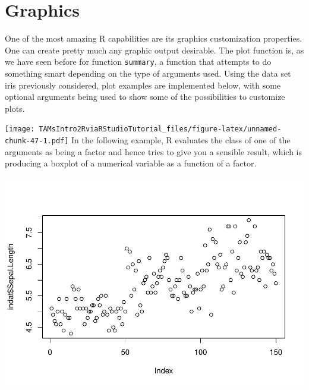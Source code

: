 \documentclass[
]{article}
\newenvironment{Shaded}{\begin{snugshade}}{\end{snugshade}}
\newcommand{\CommentTok}[1]{\textcolor[rgb]{0.56,0.35,0.01}{\textit{#1}}}
\newcommand{\FunctionTok}[1]{\textcolor[rgb]{0.00,0.00,0.00}{#1}}
\newcommand{\NormalTok}[1]{#1}
\newcommand{\OtherTok}[1]{\textcolor[rgb]{0.56,0.35,0.01}{#1}}
\newcommand{\SpecialCharTok}[1]{\textcolor[rgb]{0.00,0.00,0.00}{#1}}
\begin{document}
\hypertarget{graphics}{%
\section{Graphics}\label{graphics}}

One of the most amazing R capabilities are its graphics customization
properties. One can create pretty much any graphic output desirable. The
plot function is, as we have seen before for function \texttt{summary},
a function that attempts to do something smart depending on the type of
arguments used. Using the data set iris previously considered, plot
examples are implemented below, with some optional arguments being used
to show some of the possibilities to customize plots.

\begin{Shaded}
\end{Shaded}

\texttt{[image: TAMsIntro2RviaRStudioTutorial\_files/figure-latex/unnamed-chunk-47-1.pdf]}
In the following example, R evaluates the class of one of the arguments
as being a factor and hence tries to give you a sensible result, which
is producing a boxplot of a numerical variable as a function of a
factor.

\begin{Shaded}
\end{Shaded}

\includegraphics{TAMsIntro2RviaRStudioTutorial_files/figure-latex/unnamed-chunk-48-1.pdf}
\end{document}

